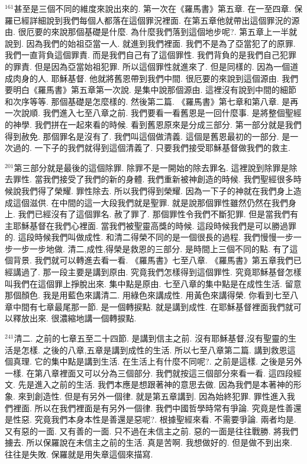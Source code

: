 \documentclass{book}
\begin{document}
$^{161}$甚至是三個不同的維度來說出來的.
第一次在《羅馬書》第五章.
在一至四章.
保羅已經詳細說到我們每個人都落在這個罪況裡面.
在第五章他就帶出這個罪況的源由.
很厄要的來說那個基礎是什麼.
為什麼我們落到這個地步呢?.
第五章上一半就說到.
因為我們的始祖亞當一人.
就進到我們裡面.
我們不是為了亞當犯了的原罪.
我們一直背負這個罪責.
而是我們自己有了這個罪性.
我們背負的是我們自己犯罪的罪責.
但是因為亞當始祖犯罪.
所以這個罪性就進來了.
但是同樣的.
因為一個道成肉身的人.
耶穌基督.
他就將舊恩帶到我們中間.
很厄要的來說到這個源由.
我們要明白《羅馬書》第五章第一次說.
是集中說那個源由.
這裡沒有說到中間的細節和次序等等.
那個基礎是怎麼樣的.
然後第二篇.
《羅馬書》第七章和第八章.
是再一次說順.
我們進入七至八章之前.
我們要看一看舊恩是一回什麼事.
是將整個聖經的神學.
我們拼在一起來看的時候.
看到舊恩原來是分成三部分.
第一部分就是我們得到赦免.
那個罪名是沒有了.
我們叫這個做清義.
這個是舊恩最初的一部分.
是一次過的.
一下子的我們就得到這個清義了.
只要我們接受耶穌基督做我們的救主.

$^{201}$第三部分就是最後的這個除罪.
除罪不是一開始的除去罪名.
這裡說到除罪是除去罪性.
當我們接受了我們的新的身體.
我們重新被神創造的時候.
我們聖經很多時候說我們得了榮耀.
罪性除去.
所以我們得到榮耀.
因為一下子的神就在我們身上造成這個滋供.
在中間的這一大段我們就是聖罪.
就是說那個罪性雖然仍然在我們身上.
我們已經沒有了這個罪名.
赦了罪了.
那個罪性令我們不斷犯罪.
但是當我們有主耶穌基督在我們心裡面.
當我們被聖靈高獎的時候.
這段時候我們是可以勝過罪的.
這段時候我們叫做成性.
和清二得榮不同的是一個很長的過程.
我們慢慢一步一步一步一步地做.
清二,成性,得榮是救恩的三部分.
是時間上三個不同的點.
有了這個背景.
我們就可以轉進去看一看.
《羅馬書》七至八章.
《羅馬書》第五章我們已經講過了.
那一段主要是講到原由.
究竟我們怎樣得到這個罪性.
究竟耶穌基督怎樣叫我們在這個罪上掙脫出來.
集中點是原由.
七至八章的集中點是在成性生活.
留意那個顏色.
我是用藍色來講清二.
用綠色來講成性.
用黃色來講得榮.
你看到七至八章中間有七章最尾那一節.
是一個轉捩點.
就是講到成性.
在耶穌基督裡面我們就可以釋放出來.
很濃縮地講一個轉捩點.

$^{241}$清二.
之前的七章五至二十四節.
是講到信主之前.
沒有耶穌基督,沒有聖靈的生活是怎樣.
之後的八章,五章是講到成性的生活.
所以七至八章第二篇.
講到救恩這個真理.
它的集中點是講到生活.
在生活上有什麼不同呢?.
之前是這樣.
之後是另外一樣.
在第八章裡面又可以分為三個部分.
我們就按這三個部分來看一看.
這四段經文.
先是進入之前的生活.
我們本應是想跟著神的意思去做.
因為我們是本著神的形象.
來到創造性.
但是有另外一個律.
就是第五章講到.
因為始終犯罪.
罪性進入我們裡面.
所以在我們裡面是有另外一個律.
我們中國哲學時常有爭論.
究竟是性善還是性惡.
究竟我們本身本性是善還是惡呢?.
根據聖經來看.
不需要爭論.
兩者均是.
又有惡的一面.
又有善的一面.
只不過在未信主之前.
惡的一面是往往戰勝.
將我們擄去.
所以保羅說在未信主之前的生活.
真是苦啊.
我想做好的.
但是做不到出來.
往往是失敗.
保羅就是用失章這個來描寫.
\end{document}
